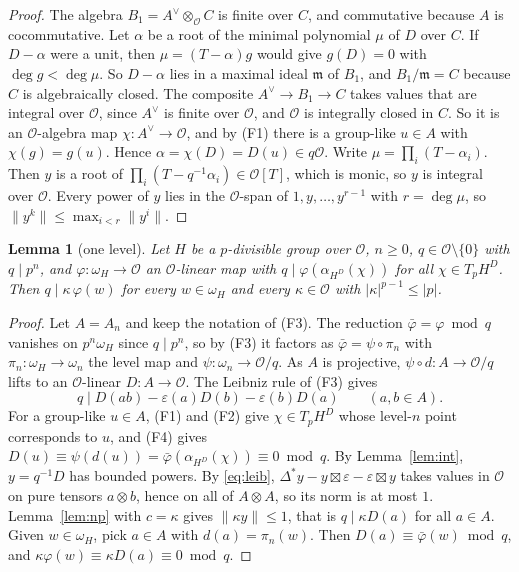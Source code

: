 \documentclass[11pt]{article}
\newtheorem{lemma}[theorem]{Lemma}
\theoremstyle{definition}
\theoremstyle{remark}
\newcommand{\cO}{\mathcal O}
\begin{document}
\begin{proof}
The algebra $B_1=A^\vee\otimes_\cO C$ is finite over $C$, and commutative because $A$ is cocommutative. Let $\alpha$ be a root of the minimal polynomial $\mu$ of $D$ over $C$. If $D-\alpha$ were a unit, then $\mu=(T-\alpha)g$ would give $g(D)=0$ with $\deg g<\deg\mu$. So $D-\alpha$ lies in a maximal ideal $\mathfrak m$ of $B_1$, and $B_1/\mathfrak m=C$ because $C$ is algebraically closed. The composite $A^\vee\to B_1\to C$ takes values that are integral over $\cO$, since $A^\vee$ is finite over $\cO$, and $\cO$ is integrally closed in $C$. So it is an $\cO$-algebra map $\chi\colon A^\vee\to\cO$, and by (F1) there is a group-like $u\in A$ with $\chi(g)=g(u)$. Hence $\alpha=\chi(D)=D(u)\in q\cO$. Write $\mu=\prod_i(T-\alpha_i)$. Then $y$ is a root of $\prod_i(T-q^{-1}\alpha_i)\in\cO[T]$, which is monic, so $y$ is integral over $\cO$. Every power of $y$ lies in the $\cO$-span of $1,y,\dots,y^{r-1}$ with $r=\deg\mu$, so $\lVert y^k\rVert\le\max_{i<r}\lVert y^i\rVert$.
\end{proof}

\begin{lemma}[one level]\label{lem:level}
Let $H$ be a $p$-divisible group over $\cO$, $n\ge0$, $q\in\cO\setminus\{0\}$ with $q\mid p^n$, and $\varphi\colon\omega_H\to\cO$ an $\cO$-linear map with $q\mid\varphi(\alpha_{H^D}(\chi))$ for all $\chi\in T_pH^D$. Then $q\mid\kappa\,\varphi(w)$ for every $w\in\omega_H$ and every $\kappa\in\cO$ with $\lvert\kappa\rvert^{p-1}\le\lvert p\rvert$.
\end{lemma}

\begin{proof}
Let $A=A_n$ and keep the notation of (F3). The reduction $\bar\varphi=\varphi\bmod q$ vanishes on $p^n\omega_H$ since $q\mid p^n$, so by (F3) it factors as $\bar\varphi=\psi\circ\pi_n$ with $\pi_n\colon\omega_H\to\omega_n$ the level map and $\psi\colon\omega_n\to\cO/q$. As $A$ is projective, $\psi\circ d\colon A\to\cO/q$ lifts to an $\cO$-linear $D\colon A\to\cO$. The Leibniz rule of (F3) gives
\begin{equation}\label{eq:leib}
q\mid D(ab)-\varepsilon(a)D(b)-\varepsilon(b)D(a)\qquad(a,b\in A).
\end{equation}
For a group-like $u\in A$, (F1) and (F2) give $\chi\in T_pH^D$ whose level-$n$ point corresponds to $u$, and (F4) gives $D(u)\equiv\psi(d(u))=\bar\varphi(\alpha_{H^D}(\chi))\equiv0\bmod q$. By Lemma~\ref{lem:int}, $y=q^{-1}D$ has bounded powers. By \eqref{eq:leib}, $\Delta^*y-y\boxtimes\varepsilon-\varepsilon\boxtimes y$ takes values in $\cO$ on pure tensors $a\otimes b$, hence on all of $A\otimes A$, so its norm is at most $1$. Lemma~\ref{lem:np} with $c=\kappa$ gives $\lVert\kappa y\rVert\le1$, that is $q\mid\kappa D(a)$ for all $a\in A$. Given $w\in\omega_H$, pick $a\in A$ with $d(a)=\pi_n(w)$. Then $D(a)\equiv\bar\varphi(w)\bmod q$, and $\kappa\varphi(w)\equiv\kappa D(a)\equiv0\bmod q$.
\end{proof}
\end{document}
